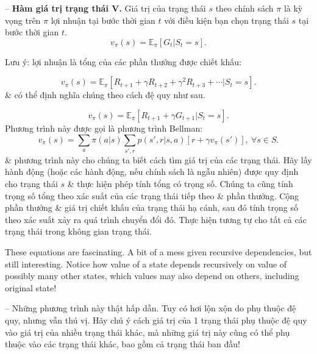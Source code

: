 \documentclass{article}
\begin{document}
\begin{itemize}
\begin{itemize}
\begin{itemize}
            -- {\bf Hàm giá trị trạng thái V.} Giá trị của trạng thái $s$ theo chính sách $\pi$ là kỳ vọng trên $\pi$ lợi nhuận tại bước thời gian $t$ với điều kiện bạn chọn trạng thái $s$ tại bước thời gian $t$.
            \begin{equation*}
                v_\pi(s) = \mathbb{E}_\pi[G_t|S_t = s].
            \end{equation*}

            Lưu ý: lợi nhuận là tổng của các phần thưởng được chiết khấu:

            \begin{equation*}
                v_\pi(s) = \mathbb{E}_\pi[R_{t+1} + \gamma R_{t+2} + \gamma^2R_{t+3} + \cdots|S_t = s].
            \end{equation*}
            \& có thể định nghĩa chúng theo cách đệ quy như sau.

            \begin{equation*}
                v_\pi(s) = \mathbb{E}_\pi[R_{t+1} + \gamma G_{t+1}|S_t = s].
            \end{equation*}
            Phương trình này được gọi là phương trình Bellman:
            \begin{equation*}
                v_\pi(s) = \sum_a \pi(a|s)\sum_{s',r} p(s',r|s,a)[r + \gamma v_\pi(s')],\ \forall s\in S.
            \end{equation*}
            \& phương trình này cho chúng ta biết cách tìm giá trị của các trạng thái. Hãy lấy hành động (hoặc các hành động, nếu chính sách là ngẫu nhiên) được quy định cho trạng thái $s$ \& thực hiện phép tính tổng có trọng số. Chúng ta cũng tính trọng số tổng theo xác suất của các trạng thái tiếp theo \& phần thưởng. Cộng phần thưởng \& giá trị chiết khấu của trạng thái hạ cánh, sau đó tính trọng số theo xác suất xảy ra quá trình chuyển đổi đó. Thực hiện tương tự cho tất cả các trạng thái trong không gian trạng thái.

            These equations are fascinating. A bit of a mess given recursive dependencies, but still interesting. Notice how value of a state depends recursively on value of possibly many other states, which values may also depend on others, including original state!

            -- Những phương trình này thật hấp dẫn. Tuy có hơi lộn xộn do phụ thuộc đệ quy, nhưng vẫn thú vị. Hãy chú ý cách giá trị của 1 trạng thái phụ thuộc đệ quy vào giá trị của nhiều trạng thái khác, mà những giá trị này cũng có thể phụ thuộc vào các trạng thái khác, bao gồm cả trạng thái ban đầu!


\end{itemize}
\end{itemize}
\end{itemize}
\end{document}
